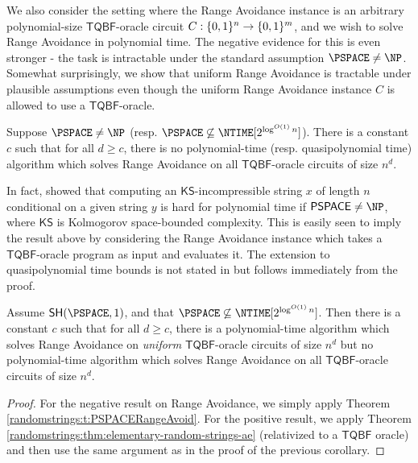We also consider the setting where the Range Avoidance instance is an arbitrary polynomial-size $\mathsf{TQBF}$-oracle circuit $C: \{0,1\}^n \to \{0,1\}^m$, and we wish to solve Range Avoidance in polynomial time. The negative evidence for this is even stronger - the task is intractable under the standard assumption $\PSPACE \neq \NP$. Somewhat surprisingly, we show that uniform Range Avoidance is tractable under plausible assumptions even though the uniform Range Avoidance instance $C$ is allowed to use a $\mathsf{TQBF}$-oracle. 

\begin{theorem} \cite{ABK24}
\label{randomstrings:t:PSPACERangeAvoid}
Suppose $\PSPACE \neq \NP$ (resp. $\PSPACE \not\subseteq \NTIME[2^{\log^{O(1)} n}]$).
There is a constant $c$ such that for all $d \geq c$, there is no polynomial-time (resp. quasipolynomial time) algorithm which solves Range Avoidance on all $\mathsf{TQBF}$-oracle circuits of size $n^d$. 
\end{theorem}

In fact, \cite{ABK24} showed that computing an $\mathsf{KS}$-incompressible string $x$ of length $n$ conditional on a given string $y$ is hard for polynomial time if $\mathsf{PSPACE} \neq \NP$, where $\mathsf{KS}$ is Kolmogorov space-bounded complexity. This is easily seen to imply the result above by considering the Range Avoidance instance which takes a $\mathsf{TQBF}$-oracle program as input and evaluates it. The extension to quasipolynomial time bounds is not stated in \cite{ABK24} but follows immediately from the proof.

\begin{corollary}
\label{randomstrings:c:UnifvsNonunifPSPACE}
Assume $\SH(\PSPACE,1)$, and that $\PSPACE \not\subseteq \NTIME[2^{\log^{O(1)} n}]$. Then there is a constant $c$ such that for all $d \geq c$, there is a polynomial-time algorithm which solves Range Avoidance on {\it uniform} $\mathsf{TQBF}$-oracle circuits of size $n^d$ but no polynomial-time algorithm which solves Range Avoidance on all $\mathsf{TQBF}$-oracle circuits of size $n^d$.
\end{corollary}

\begin{proof}
For the negative result on Range Avoidance, we simply apply Theorem \ref{randomstrings:t:PSPACERangeAvoid}. For the positive result, we apply Theorem \ref{randomstrings:thm:elementary-random-strings-ae} (relativized to a $\mathsf{TQBF}$ oracle) and then use the same argument as in the proof of the previous corollary.
\end{proof}

